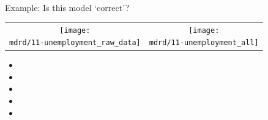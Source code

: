 \begin{frame}{Example: Is this model `correct'?}
\newcommand{\wmgd}{0.5\columnwidth}
\newcommand{\hmgd}{3.0cm}
\newcommand{\mdrd}{figures/11-unemployment}
\newcommand{\mbm}{\hspace{-0.3cm}}
\begin{tabular}{cc}
\mbm \texttt{[image: \\mdrd/11-unemployment\_raw\_data]} & \texttt{[image: \\mdrd/11-unemployment\_all]}
\end{tabular}

{\footnotesize
\begin{itemize}

  \item  

  \item  

  \item  

  \item  

  \item  

\end{itemize}
}
\end{frame}

